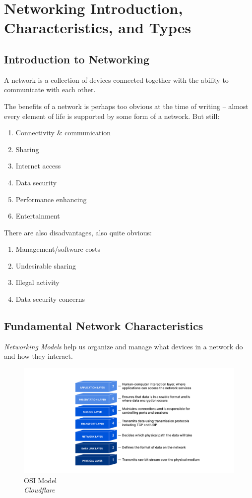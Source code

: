\chapter{Networking Introduction, Characteristics, and Types}

\section{Introduction to Networking}

A network is a collection of devices connected together with the ability to communicate with each other.

The benefits of a network is perhaps too obvious at the time of writing -- almost every element of life is supported by some form of a network. But still:

\begin{enumerate}
    \item Connectivity \& communication
    \item Sharing
    \item Internet access
    \item Data security
    \item Performance enhancing
    \item Entertainment
\end{enumerate}

There are also disadvantages, also quite obvious:

\begin{enumerate}
    \item Management/software costs
    \item Undesirable sharing
    \item Illegal activity
    \item Data security concerns
\end{enumerate}

\section{Fundamental Network Characteristics}

\textit{Networking Models} help us organize and manage what devices in a network do and how they interact. 

\begin{figure}[H]
    \centering
    \includegraphics[width=\linewidth]{assets/osi-model.png}
    \caption{OSI Model\\
    \small \textit{Cloudflare}}
    \label{fig:label}
\end{figure}

